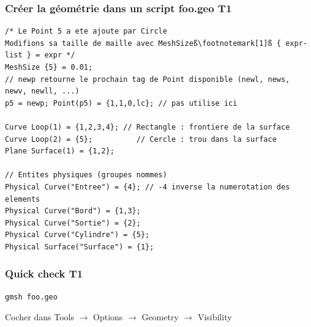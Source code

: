 \documentclass[aspectratio=169]{beamer}
\begin{document}
\begin{frame}[fragile]
\frametitle{Créer la géométrie dans un script foo.geo \hfill T1}
\begin{lstlisting}[aboveskip=0.5mm,frame=none,escapechar=ß]
/* Le Point 5 a ete ajoute par Circle
Modifions sa taille de maille avec MeshSizeß\footnotemark[1]ß { expr-list } = expr */
MeshSize {5} = 0.01;
// newp retourne le prochain tag de Point disponible (newl, news, newv, newll, ...)
p5 = newp; Point(p5) = {1,1,0,lc}; // pas utilise ici

Curve Loop(1) = {1,2,3,4}; // Rectangle : frontiere de la surface
Curve Loop(2) = {5};          // Cercle : trou dans la surface
Plane Surface(1) = {1,2};

// Entites physiques (groupes nommes)
Physical Curve("Entree") = {4}; // -4 inverse la numerotation des elements
Physical Curve("Bord") = {1,3};
Physical Curve("Sortie") = {2};
Physical Curve("Cylindre") = {5};
Physical Surface("Surface") = {1};
\end{lstlisting}
\end{frame}

\begin{frame}[fragile]
\frametitle{Quick check \hfill T1}
\begin{lstlisting}[belowskip=1mm]
gmsh foo.geo
\end{lstlisting}
Cocher dans Tools $\rightarrow$ Options $\rightarrow$ Geometry $\rightarrow$ Visibility
  \begin{figure}
    \centering
  \end{figure}
\end{frame}
\end{document}
